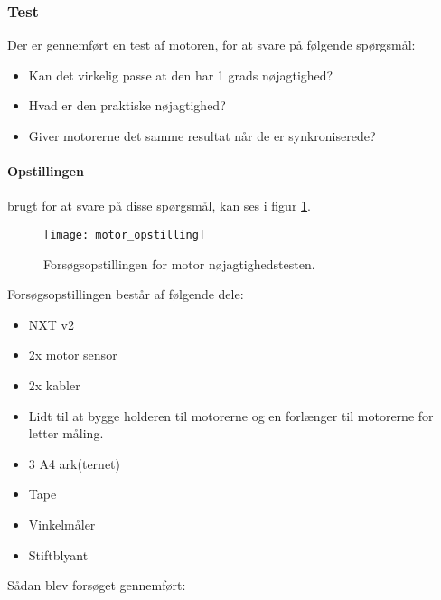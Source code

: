 \subsubsection{Test}
Der er gennemført en test af motoren, for at svare på følgende spørgsmål:

\begin{itemize}
\item Kan det virkelig passe at den har 1 grads nøjagtighed?
\item Hvad er den praktiske nøjagtighed?
\item Giver motorerne det samme resultat når de er synkroniserede?
\end{itemize}

\paragraph{Opstillingen} brugt for at svare på disse spørgsmål, kan ses i figur \ref{sensor:motor_sensor_opstilling}.

\begin{figure}[h]
\centering
\texttt{[image: motor\_opstilling]} 	
\caption{Forsøgsopstillingen for motor nøjagtighedstesten.}
\label{sensor:motor_sensor_opstilling}
\end{figure}

Forsøgsopstillingen består af følgende dele:
\begin{itemize}
\item NXT v2
\item 2x \legoms motor sensor
\item 2x \legoms kabler
\item Lidt \lego til at bygge holderen til motorerne og en forlænger til motorerne for letter måling.
\item 3 A4 ark(ternet)
\item Tape
\item Vinkelmåler
\item Stiftblyant
\end{itemize}

Sådan blev forsøget gennemført:

